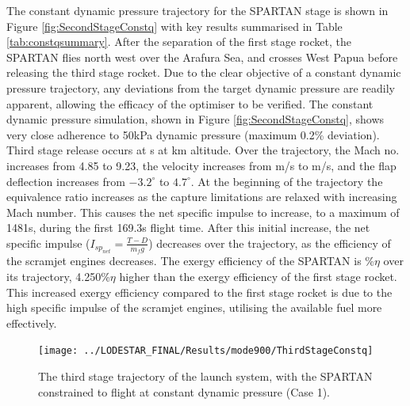 The constant dynamic pressure trajectory for the SPARTAN stage is shown in Figure \ref{fig:SecondStageConstq} with key results summarised in Table \ref{tab:constqsummary}. After the separation of the first stage rocket, the SPARTAN flies north west over the Arafura Sea, and crosses West Papua before releasing the third stage rocket. Due to the clear objective of a constant dynamic pressure trajectory, any deviations from the target dynamic pressure are readily apparent, allowing the efficacy of the optimiser to be verified. 
The constant dynamic pressure simulation, shown in Figure \ref{fig:SecondStageConstq}, shows very close adherence to 50kPa dynamic pressure (maximum 0.2\% deviation). Third stage release occurs at \secondFlightTimeConstq s at \secondthirdSeparationAltConstq km altitude. 
Over the trajectory, the Mach no. increases from 4.85 to 9.23, the velocity increases from \firstsecondSeparationvConstq m/s to \secondthirdSeparationvConstq m/s, and the flap deflection increases from $-3.2^\circ$ to $4.7^\circ$. At the beginning of the trajectory the equivalence ratio increases as the capture limitations are relaxed with increasing Mach number. This causes the net specific impulse to increase, to a maximum of 1481s, during the first 169.3s flight time.  After this initial increase, the net specific impulse ($I_{sp_{net}} = \frac{T-D}{\dot{m}_f g}$) decreases over the trajectory, as the efficiency of the scramjet engines decreases. 
The exergy efficiency of the SPARTAN is \secondExergyEffConstq \%$\eta$ over its trajectory, 4.250\%$\eta$ higher than the exergy efficiency of the first stage rocket. This increased exergy efficiency compared to the first stage rocket is due to the high specific impulse of the scramjet engines, utilising the available fuel more effectively. 



\begin{figure}[ht!]
\centering
\texttt{[image: ../LODESTAR\_FINAL/Results/mode900/ThirdStageConstq]}
\caption{The third stage trajectory of the launch system, with the SPARTAN constrained to flight at constant dynamic pressure (Case 1).}
\label{fig:ThirdStageConstq}
\end{figure}

